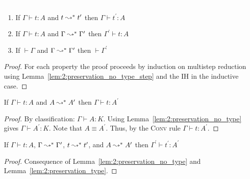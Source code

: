 \begin{lemma}
    \label{lem:2:preservation_no_type}
    \textcolor{white}{\_}
    \begin{enumerate}
        \item If $\Gamma \vdash t : A$ and $t \leadsto^* t^\prime$ then $\Gamma \vdash t^\prime : A$
        \item If $\Gamma \vdash t : A$ and $\Gamma \leadsto^* \Gamma^\prime$ then $\Gamma^\prime \vdash t : A$
        \item If $\vdash \Gamma$ and $\Gamma \leadsto^* \Gamma^\prime$ then $\vdash \Gamma^\prime$
    \end{enumerate}
\end{lemma}
\begin{proof}
    For each property the proof proceeds by induction on multistep reduction using Lemma~\ref{lem:2:preservation_no_type_step} and the IH in the inductive case.
\end{proof}

\begin{lemma}
    \label{lem:2:preservation_type}
    If $\Gamma \vdash t : A$ and $A \leadsto^* A^\prime$ then $\Gamma \vdash t : A^\prime$
\end{lemma}
\begin{proof}
    By classification: $\Gamma \vdash A : K$.
    Using Lemma~\ref{lem:2:preservation_no_type} gives $\Gamma \vdash A^\prime : K$.
    Note that $A \equiv A^\prime$.
    Thus, by the \textsc{Conv} rule $\Gamma \vdash t : A^\prime$.
\end{proof}

\begin{theorem}[Preservation]
    \label{lem:2:preservation}
    If $\Gamma \vdash t : A$, $\Gamma \leadsto^* \Gamma^\prime$, $t \leadsto^* t^\prime$, and $A \leadsto^* A^\prime$ then $\Gamma^\prime \vdash t^\prime : A^\prime$
\end{theorem}
\begin{proof}
    Consequence of Lemma~\ref{lem:2:preservation_no_type} and Lemma~\ref{lem:2:preservation_type}.
\end{proof}
